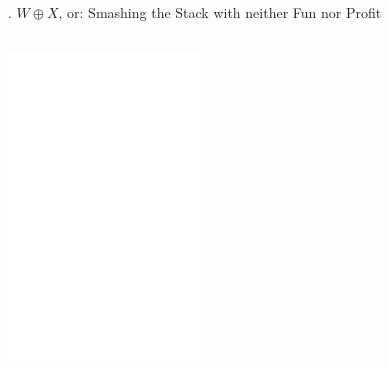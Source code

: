 \documentclass[9pt]{beamer}
\begin{document}
\begin{frame}{\theframenumber. $W\oplus X$, or: Smashing the Stack with neither Fun nor Profit}
\begin{columns}
\begin{column}{.5\textwidth}
      \includegraphics[width=\textwidth]{../images/mem-map.png}
    \end{column}
  \end{columns}
  
\end{frame}
\end{document}
